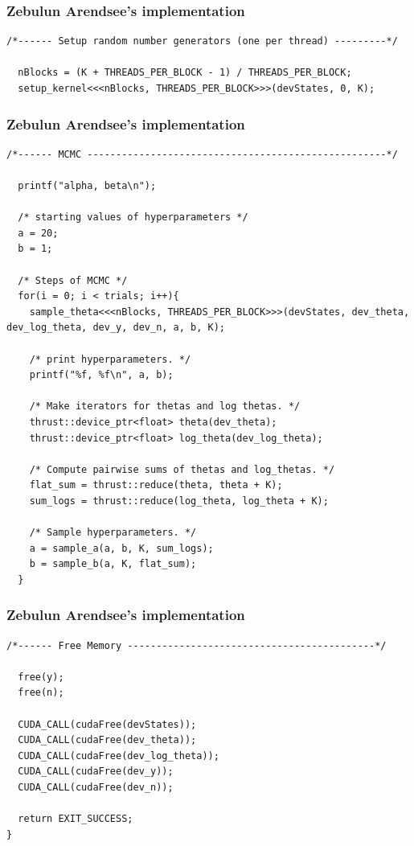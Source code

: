 \documentclass[handout]{beamer}
\numberwithin{equation}{section}
\begin{document}
\begin{frame}[fragile]
\frametitle{Zebulun Arendsee's implementation}
\begin{lstlisting}[name=mc]
  /*------ Setup random number generators (one per thread) ---------*/

  nBlocks = (K + THREADS_PER_BLOCK - 1) / THREADS_PER_BLOCK;
  setup_kernel<<<nBlocks, THREADS_PER_BLOCK>>>(devStates, 0, K);

\end{lstlisting}
\end{frame}

\begin{frame}[fragile]
\frametitle{Zebulun Arendsee's implementation}
\begin{lstlisting}[name=mc]
  /*------ MCMC ----------------------------------------------------*/
    
  printf("alpha, beta\n");

  /* starting values of hyperparameters */
  a = 20; 
  b = 1; 

  /* Steps of MCMC */  
  for(i = 0; i < trials; i++){    
    sample_theta<<<nBlocks, THREADS_PER_BLOCK>>>(devStates, dev_theta, dev_log_theta, dev_y, dev_n, a, b, K);

    /* print hyperparameters. */
    printf("%f, %f\n", a, b);

    /* Make iterators for thetas and log thetas. */
    thrust::device_ptr<float> theta(dev_theta);
    thrust::device_ptr<float> log_theta(dev_log_theta);
    
    /* Compute pairwise sums of thetas and log_thetas. */
    flat_sum = thrust::reduce(theta, theta + K);
    sum_logs = thrust::reduce(log_theta, log_theta + K);
  
    /* Sample hyperparameters. */
    a = sample_a(a, b, K, sum_logs);
    b = sample_b(a, K, flat_sum);
  }
\end{lstlisting}
\end{frame}

\begin{frame}[fragile]
\frametitle{Zebulun Arendsee's implementation}
\begin{lstlisting}[name=mc]
  /*------ Free Memory -------------------------------------------*/

  free(y);
  free(n);

  CUDA_CALL(cudaFree(devStates));
  CUDA_CALL(cudaFree(dev_theta));
  CUDA_CALL(cudaFree(dev_log_theta));
  CUDA_CALL(cudaFree(dev_y));
  CUDA_CALL(cudaFree(dev_n));

  return EXIT_SUCCESS;
}
\end{lstlisting}
\end{frame}
\end{document}

